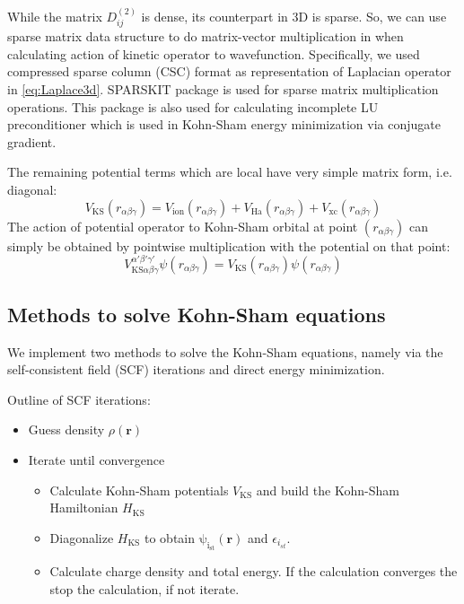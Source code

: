 While the matrix $D^{(2)}_{ij}$ is dense, its counterpart in 3D is sparse. So, we can
use sparse matrix data structure to do matrix-vector multiplication in when calculating
action of kinetic operator to wavefunction. Specifically, we used compressed sparse column
(CSC) format as representation of Laplacian operator in \eqref{eq:Laplace3d}.
\textsf{SPARSKIT}\cite{Saad1994} package is used for sparse matrix multiplication
operations. This package is also used for calculating incomplete LU preconditioner
which is used in Kohn-Sham energy minimization via conjugate gradient.

The remaining potential terms which are local have very simple matrix form, i.e.
diagonal:
\begin{equation}
V_{\mathrm{KS}}(r_{\alpha\beta\gamma}) = V_{\mathrm{ion}}(r_{\alpha\beta\gamma}) +
V_{\mathrm{Ha}}(r_{\alpha\beta\gamma}) + V_{\mathrm{xc}}(r_{\alpha\beta\gamma})
\end{equation}  
The action of potential operator to Kohn-Sham orbital at point
$(r_{\alpha\beta\gamma})$ can simply be
obtained by pointwise multiplication with the potential on that point:
\begin{equation}
V_{\mathrm{KS}\alpha\beta\gamma}^{\alpha'\beta'\gamma'} \psi(r_{\alpha\beta\gamma}) =
V_{\mathrm{KS}}(r_{\alpha\beta\gamma})\psi(r_{\alpha\beta\gamma})
\end{equation}

\subsection{Methods to solve Kohn-Sham equations}

We implement two methods to solve the Kohn-Sham equations, namely
via the self-consistent field (SCF) iterations and
direct energy minimization.

Outline of SCF iterations:
\begin{itemize}
\item Guess density $\rho(\mathbf{r})$
\item Iterate until convergence
\begin{itemize}
\item Calculate Kohn-Sham potentials $V_{\mathrm{KS}}$ and build the Kohn-Sham
Hamiltonian $H_{\mathrm{KS}}$
\item Diagonalize $H_{\mathrm{KS}}$ to obtain $\mathrm{\psi_{i_{st}}}(\mathbf{r})$
and $\epsilon_{i_{st}}$.
\item Calculate charge density and total energy. If the calculation converges
the stop the calculation, if not iterate.
\end{itemize}
\end{itemize}

